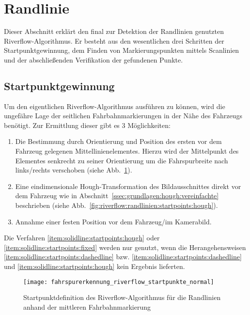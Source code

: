 \section{Randlinie} \label{ssec:fahrspurerkennung:riverflow:randlinie}
Dieser Abschnitt erklärt den final zur Detektion der Randlinien genutzten Riverflow-Algorithmus. Er besteht aus den wesentlichen drei Schritten der Startpunktgewinnung, dem Finden von Markierungspunkten mittels Scanlinien und der abschließenden Verifikation der gefundenen Punkte.
\subsection{Startpunktgewinnung \dcsecondauthorshort}
\label{sssec:fahrspurerkennung:riverflow:randlinie:startpunktgewinnung}
Um den eigentlichen Riverflow-Algorithmus ausführen zu können, wird die ungefähre Lage der seitlichen Fahrbahnmarkierungen in der Nähe des Fahrzeugs benötigt. Zur Ermittlung dieser gibt es 3 Möglichkeiten:
\begin{enumerate}
\item \label{item:solidline:startpoints:dashedline}
Die Bestimmung durch Orientierung und Position des ersten vor dem Fahrzeug gelegenen Mittellinienelementes. Hierzu wird der Mittelpunkt des Elementes senkrecht zu seiner Orientierung um die Fahrspurbreite nach links/rechts verschoben (siehe Abb.~\ref{fig:riverflow:randlinien:startpoints:dashedline}).
\item \label{item:solidline:startpoints:hough}
Eine eindimensionale Hough-Transformation des Bildausschnittes direkt vor dem Fahrzeug wie in Abschnitt~\ref{ssec:grundlagen:hough:vereinfachte} beschrieben (siehe Abb.~\ref{fig:riverflow:randlinien:startpoints:hough}). 
\item \label{item:solidline:startpoints:fixed}
Annahme einer festen Position vor dem Fahrzeug/im Kamerabild.
\end{enumerate}

Die Verfahren \ref{item:solidline:startpoints:hough} oder \ref{item:solidline:startpoints:fixed} werden nur genutzt, wenn die Herangehensweisen \ref{item:solidline:startpoints:dashedline} bzw. \ref{item:solidline:startpoints:dashedline} und \ref{item:solidline:startpoints:hough} kein Ergebnis lieferten.

\begin{figure}[htbp]
	\centering
	\texttt{[image: fahrspurerkennung\_riverflow\_startpunkte\_normal]}
	\caption{Startpunktdefinition des Riverflow-Algorithmus für die Randlinien anhand der mittleren Fahrbahnmarkierung}
	\label{fig:riverflow:randlinien:startpoints:dashedline}
\end{figure}

